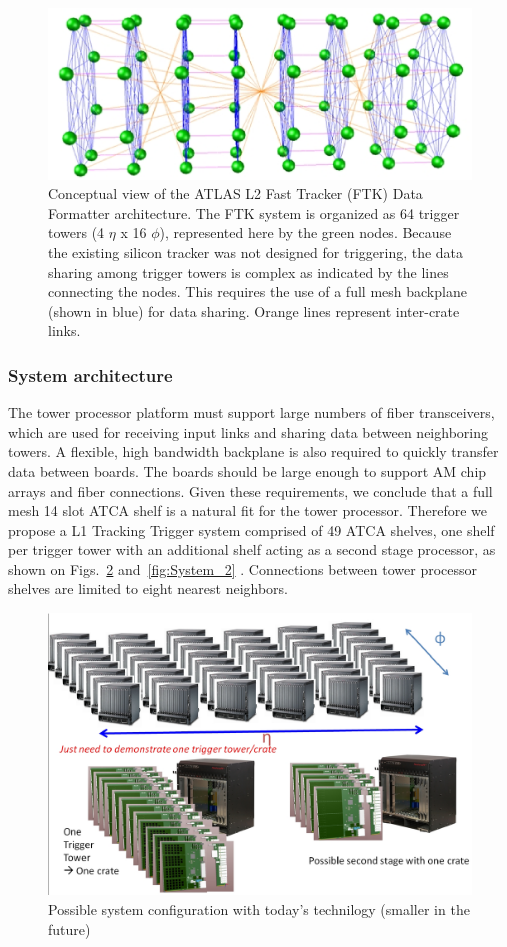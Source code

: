\begin{figure}[ht!]
\centering
\includegraphics[width=0.7\columnwidth]{Plots/TT_config_ATLAS.eps}
\caption{Conceptual view of the ATLAS L2 Fast Tracker (FTK) Data Formatter architecture.  The FTK system is organized as 64 trigger towers (4 $\eta$ x 16 $\phi$), represented here by the green nodes.  Because the existing silicon tracker was not designed for triggering, the data sharing among trigger towers is complex as indicated by the lines connecting the nodes.  This requires the use of a full mesh backplane (shown in blue) for data sharing.  Orange lines represent inter-crate links.}
\label{fig:TT_config_ATLAS}
\end{figure}

\subsubsection{System architecture}

\noindent The tower processor platform must support large numbers of fiber transceivers, which are used for receiving input links and sharing data between neighboring towers.  A flexible, high bandwidth backplane is also required to quickly transfer data between boards.  The boards should be large enough to support AM chip arrays and fiber connections.  Given these requirements, we conclude that a full mesh 14 slot ATCA shelf is a natural fit for the tower processor.  Therefore we propose a L1 Tracking Trigger system comprised of 49 ATCA shelves, one shelf per trigger tower with an additional shelf acting as a second stage processor, as shown on Figs.~\ref{fig:System_1} and~\ref{fig:System_2} . Connections between tower processor shelves are limited to eight nearest neighbors.

\begin{figure}[ht!]
\centering
\includegraphics[width=0.7\columnwidth]{Plots/System_1.eps}
\caption{Possible system configuration with today's technilogy (smaller in the future)}
\label{fig:System_1}
\end{figure}

